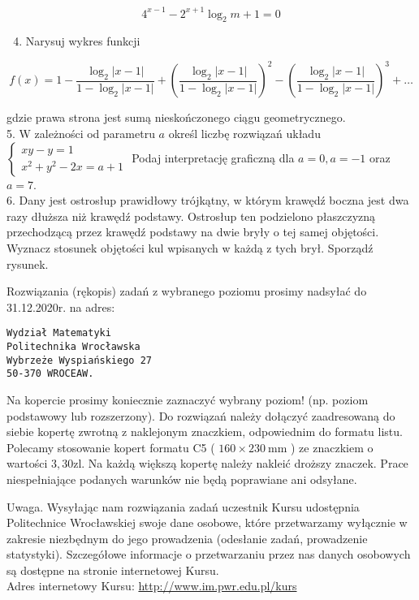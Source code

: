 \documentclass[10pt]{article}
\begin{document}
$$
4^{x-1}-2^{x+1} \log _{2} m+1=0
$$

\begin{enumerate}
  \setcounter{enumi}{3}
  \item Narysuj wykres funkcji
\end{enumerate}

$$
f(x)=1-\frac{\log _{2}|x-1|}{1-\log _{2}|x-1|}+\left(\frac{\log _{2}|x-1|}{1-\log _{2}|x-1|}\right)^{2}-\left(\frac{\log _{2}|x-1|}{1-\log _{2}|x-1|}\right)^{3}+\ldots
$$

gdzie prawa strona jest sumą nieskończonego ciągu geometrycznego.\\
5. W zależności od parametru $a$ określ liczbę rozwiązań układu $\left\{\begin{array}{l}x y-y=1 \\ x^{2}+y^{2}-2 x=a+1\end{array}\right.$ Podaj interpretację graficzną dla $a=0, a=-1$ oraz $a=7$.\\
6. Dany jest ostrosłup prawidłowy trójkątny, w którym krawędź boczna jest dwa razy dłuższa niż krawędź podstawy. Ostrosłup ten podzielono płaszczyzną przechodzącą przez krawędź podstawy na dwie bryły o tej samej objętości. Wyznacz stosunek objętości kul wpisanych w każdą z tych brył. Sporządź rysunek.

Rozwiązania (rękopis) zadań z wybranego poziomu prosimy nadsyłać do 31.12.2020r. na adres:

\begin{verbatim}
Wydział Matematyki
Politechnika Wrocławska
Wybrzeże Wyspiańskiego 27
50-370 WROCEAW.
\end{verbatim}

Na kopercie prosimy koniecznie zaznaczyć wybrany poziom! (np. poziom podstawowy lub rozszerzony). Do rozwiązań należy dołączyć zaadresowaną do siebie kopertę zwrotną z naklejonym znaczkiem, odpowiednim do formatu listu. Polecamy stosowanie kopert formatu C5 ( $160 \times 230 \mathrm{~mm}$ ) ze znaczkiem o wartości $3,30 \mathrm{zl}$. Na każdą większą kopertę należy nakleić droższy znaczek. Prace niespełniające podanych warunków nie będą poprawiane ani odsyłane.

Uwaga. Wysyłając nam rozwiązania zadań uczestnik Kursu udostępnia Politechnice Wrocławskiej swoje dane osobowe, które przetwarzamy wyłącznie w zakresie niezbędnym do jego prowadzenia (odesłanie zadań, prowadzenie statystyki). Szczegółowe informacje o przetwarzaniu przez nas danych osobowych są dostępne na stronie internetowej Kursu.\\
Adres internetowy Kursu: \href{http://www.im.pwr.edu.pl/kurs}{http://www.im.pwr.edu.pl/kurs}
\end{document}
